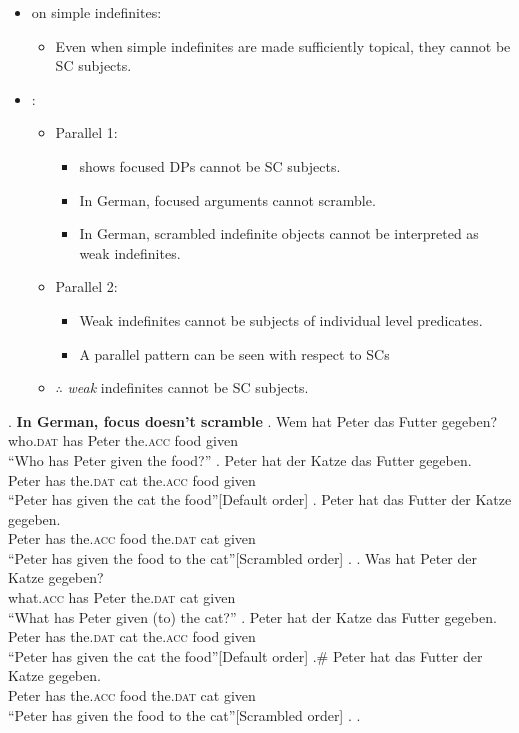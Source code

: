 \documentclass[GPFinal]{subfiles}
\begin{document}
\begin{itemize}
  \item \textcite{mikkelsen2004specifying} on simple indefinites:
    \begin{itemize}
      \item Even when simple indefinites are made sufficiently topical, they cannot be SC subjects.
    \end{itemize}
  \item \textcite{heycockkroch1999pseudocleft}:
    \begin{itemize}
      \item Parallel 1:
	\begin{itemize}
	  \item \Last shows focused DPs cannot be SC subjects.
	  \item In German, focused arguments cannot scramble. \parencite{lenerz1977zur}
	  \item In German, scrambled indefinite objects cannot be interpreted as weak indefinites. \parencite{dehoop1992case,diesing1992indefinites}
	\end{itemize}
      \item Parallel 2:
	\begin{itemize}
	  \item Weak indefinites cannot be subjects of individual level predicates. \parencite{milsark1974existential}
	  \item A parallel pattern can be seen with respect to SCs
	\end{itemize}
      \item $\therefore$ \textit{weak} indefinites cannot be SC subjects.
    \end{itemize}
\end{itemize}
\ex. \textbf{In German, focus doesn't scramble}
  \ag. Wem hat Peter das Futter gegeben?\\
who.\textsc{dat} has Peter the.\textsc{acc} food given\\
``Who has Peter given the food?''
    \ag. Peter hat der Katze das Futter gegeben.\\
Peter has the.\textsc{dat} cat the.\textsc{acc} food given\\
``Peter has given the cat the food''\hfill[Default order]
    \bg. Peter hat das Futter der Katze gegeben.\\
Peter has the.\textsc{acc} food the.\textsc{dat} cat given\\
``Peter has given the food to the cat''\hfill[Scrambled order]
    \z.
  \bg. Was hat Peter der Katze gegeben?\\
what.\textsc{acc} has Peter the.\textsc{dat} cat given\\
``What has Peter given (to) the cat?''
    \ag. Peter hat der Katze das Futter gegeben.\\
Peter has the.\textsc{dat} cat the.\textsc{acc} food given\\
``Peter has given the cat the food''\hfill[Default order]
    \bg.\# Peter hat das Futter der Katze gegeben.\\
Peter has the.\textsc{acc} food the.\textsc{dat} cat given\\
``Peter has given the food to the cat''\hfill[Scrambled order]
    \z.
  \z.
\end{document}
